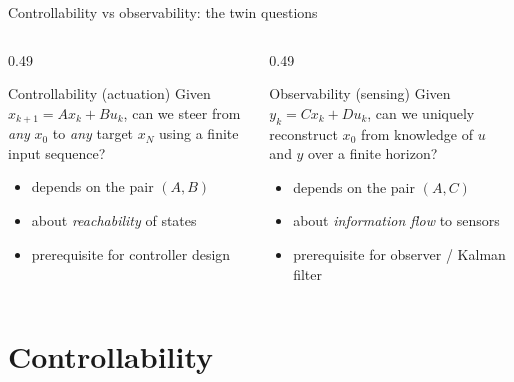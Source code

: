 \documentclass[aspectratio=169,10pt]{beamer}
\begin{document}
\begin{frame}{Controllability vs observability: the twin questions}
\begin{columns}[T,totalwidth=\textwidth]
\begin{column}{0.49\textwidth}
\begin{defnbox}{Controllability (actuation)}
Given $x_{k+1}=Ax_k+Bu_k$, can we steer from \emph{any} $x_0$ to
\emph{any} target $x_N$ using a finite input sequence?
\end{defnbox}
\vspace{0.2em}
\begin{itemize}
  \item depends on the pair $(A,B)$
  \item about \emph{reachability} of states
  \item prerequisite for controller design
\end{itemize}
\end{column}
\begin{column}{0.49\textwidth}
\begin{defnbox}{Observability (sensing)}
Given $y_k=Cx_k+Du_k$, can we uniquely reconstruct $x_0$ from knowledge
of $u$ and $y$ over a finite horizon?
\end{defnbox}
\vspace{0.2em}
\begin{itemize}
  \item depends on the pair $(A,C)$
  \item about \emph{information flow} to sensors
  \item prerequisite for observer / Kalman filter
\end{itemize}
\end{column}
\end{columns}
\end{frame}

\section{Controllability}
\end{document}
